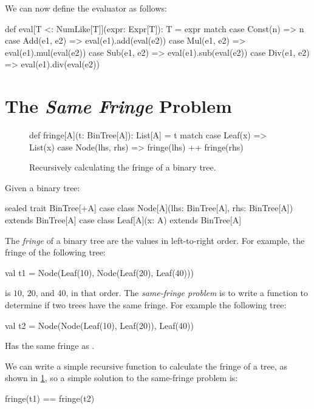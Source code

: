 \documentclass{book}
\begin{document}
We can now define the evaluator as follows:

\begin{scalacode}
def eval[T <: NumLike[T]](expr: Expr[T]): T = expr match {
  case Const(n) => n
  case Add(e1, e2) => eval(e1).add(eval(e2))
  case Mul(e1, e2) => eval(e1).mul(eval(e2))
  case Sub(e1, e2) => eval(e1).sub(eval(e2))
  case Div(e1, e2) => eval(e1).div(eval(e2))
}
\end{scalacode}


\newlecture

\section{The \emph{Same Fringe} Problem}

\begin{figure}
\begin{scalacode}
def fringe[A](t: BinTree[A]): List[A] = t match {
  case Leaf(x) => List(x)
  case Node(lhs, rhs) => fringe(lhs) ++ fringe(rhs)
}
\end{scalacode}
\caption{Recursively calculating the fringe of a binary tree.}
\label{fringeRec}
\end{figure}

Given a binary tree:

\begin{scalacode}
sealed trait BinTree[+A]
case class Node[A](lhs: BinTree[A], rhs: BinTree[A]) extends BinTree[A]
case class Leaf[A](x: A) extends BinTree[A]
\end{scalacode}

The \emph{fringe} of a binary tree are the values in left-to-right order. For
example, the fringe of the following tree:
\begin{scalacode}
val t1 = Node(Leaf(10), Node(Leaf(20), Leaf(40)))
\end{scalacode}
is $10$, $20$, and $40$, in that order. The \emph{same-fringe problem} is to write
a function to determine if two trees have the same fringe. For
example the following tree:
%
\begin{scalacode}
val t2 = Node(Node(Leaf(10), Leaf(20)), Leaf(40))
\end{scalacode}
Has the same fringe as . 

We can write a simple recursive function to calculate the fringe of a tree,
as shown in \cref{fringeRec}, so a simple solution to the same-fringe problem 
is:
\begin{scalacode}
fringe(t1) == fringe(t2)
\end{scalacode}
\end{document}
